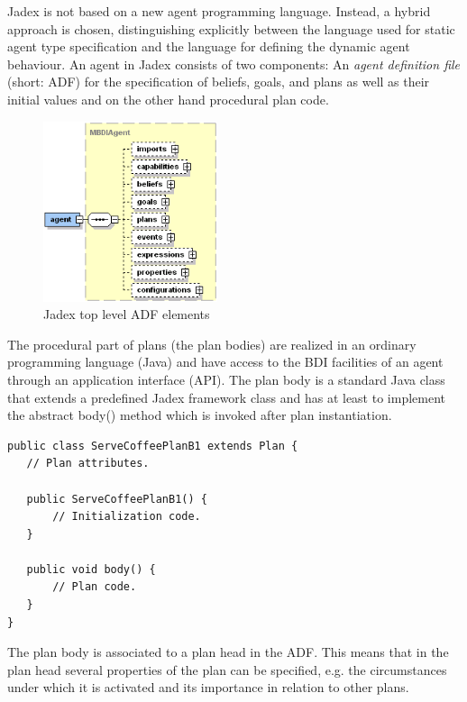 Jadex is not based on a new agent programming language.
Instead, a hybrid approach is chosen, distinguishing explicitly between the language used for static agent type specification and the language for defining the dynamic agent behaviour.
An agent in Jadex consists of two components: An \emph{agent definition file} (short: ADF) for the specification of beliefs, goals, and plans as well as their initial values and on the other hand procedural plan code.
\begin{figure}
	\centering
	\includegraphics[height=200px]{images/jadexagentadf.png}
  \caption{Jadex top level ADF elements \cite{ActiveComponents}}
	\label{fig3}
\end{figure}
The procedural part of plans (the plan bodies) are realized in an ordinary programming language (Java) and have access to the BDI facilities of an agent through an application interface (API).
The plan body is a standard Java class that extends a predefined Jadex framework class and has at least to implement the abstract body() method which is invoked after plan instantiation.
\begin{lstlisting}
public class ServeCoffeePlanB1 extends Plan {
   // Plan attributes.

   public ServeCoffeePlanB1() {
       // Initialization code.
   }

   public void body() {
       // Plan code.
   }
}
\end{lstlisting}
The plan body is associated to a plan head in the ADF.
This means that in the plan head several properties of the plan can be specified, e.g. the circumstances under which it is activated and its importance in relation to other plans.
